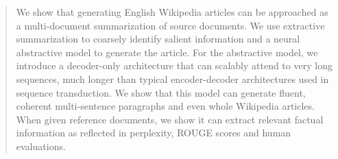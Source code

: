 \begin{abstract}
    We show that generating English Wikipedia articles can be approached as a multi-document
    summarization of source documents.
    We use extractive summarization to coarsely identify salient information
    and a neural abstractive model to
    generate the article.
    For the abstractive model, we introduce a decoder-only architecture that can
	scalably attend to very long sequences,
	much longer than typical encoder-decoder architectures
	used in sequence transduction.
    We show that this model can generate fluent, coherent multi-sentence
        paragraphs and even whole Wikipedia articles.
    When given reference documents, we show it can extract relevant
        factual information
        as reflected in perplexity, ROUGE scores and human evaluations.
\end{abstract}
